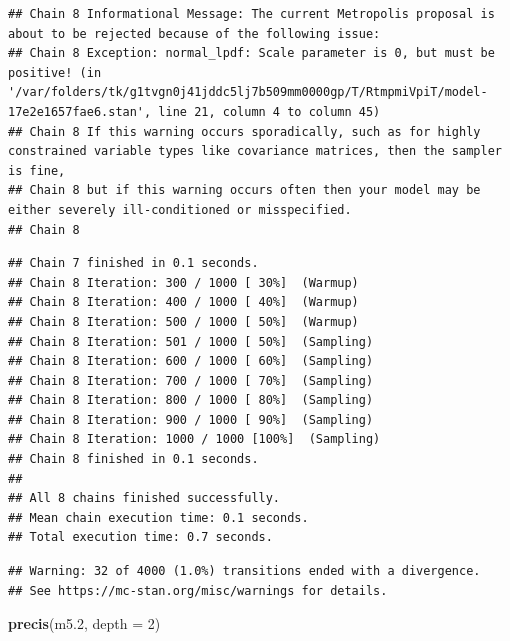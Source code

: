\documentclass[
]{book}
\newenvironment{Shaded}{\begin{snugshade}}{\end{snugshade}}
\newcommand{\AttributeTok}[1]{\textcolor[rgb]{0.13,0.29,0.53}{#1}}
\newcommand{\DecValTok}[1]{\textcolor[rgb]{0.00,0.00,0.81}{#1}}
\newcommand{\FloatTok}[1]{\textcolor[rgb]{0.00,0.00,0.81}{#1}}
\newcommand{\FunctionTok}[1]{\textcolor[rgb]{0.13,0.29,0.53}{\textbf{#1}}}
\newcommand{\NormalTok}[1]{#1}
\begin{document}
\begin{verbatim}
## Chain 8 Informational Message: The current Metropolis proposal is about to be rejected because of the following issue:
## Chain 8 Exception: normal_lpdf: Scale parameter is 0, but must be positive! (in '/var/folders/tk/g1tvgn0j41jddc5lj7b509mm0000gp/T/RtmpmiVpiT/model-17e2e1657fae6.stan', line 21, column 4 to column 45)
## Chain 8 If this warning occurs sporadically, such as for highly constrained variable types like covariance matrices, then the sampler is fine,
## Chain 8 but if this warning occurs often then your model may be either severely ill-conditioned or misspecified.
## Chain 8
\end{verbatim}

\begin{verbatim}
## Chain 7 finished in 0.1 seconds.
## Chain 8 Iteration: 300 / 1000 [ 30%]  (Warmup) 
## Chain 8 Iteration: 400 / 1000 [ 40%]  (Warmup) 
## Chain 8 Iteration: 500 / 1000 [ 50%]  (Warmup) 
## Chain 8 Iteration: 501 / 1000 [ 50%]  (Sampling) 
## Chain 8 Iteration: 600 / 1000 [ 60%]  (Sampling) 
## Chain 8 Iteration: 700 / 1000 [ 70%]  (Sampling) 
## Chain 8 Iteration: 800 / 1000 [ 80%]  (Sampling) 
## Chain 8 Iteration: 900 / 1000 [ 90%]  (Sampling) 
## Chain 8 Iteration: 1000 / 1000 [100%]  (Sampling) 
## Chain 8 finished in 0.1 seconds.
## 
## All 8 chains finished successfully.
## Mean chain execution time: 0.1 seconds.
## Total execution time: 0.7 seconds.
\end{verbatim}

\begin{verbatim}
## Warning: 32 of 4000 (1.0%) transitions ended with a divergence.
## See https://mc-stan.org/misc/warnings for details.
\end{verbatim}

\begin{Shaded}
\begin{Highlighting}[]
\FunctionTok{precis}\NormalTok{(m5}\FloatTok{.2}\NormalTok{, }\AttributeTok{depth =} \DecValTok{2}\NormalTok{)}
\end{Highlighting}
\end{Shaded}
\end{document}
